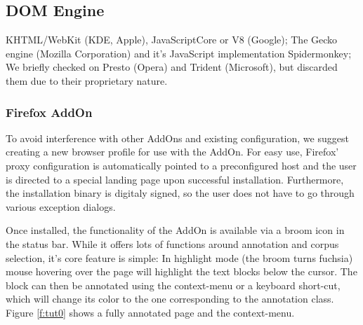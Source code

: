 \subsection{DOM Engine}

KHTML/WebKit (KDE, Apple), JavaScriptCore or V8 (Google);
The Gecko engine (Mozilla Corporation) and it's JavaScript implementation Spidermonkey;
We briefly checked on Presto (Opera) and Trident (Microsoft), but discarded them due to their proprietary nature.

\subsubsection{Firefox AddOn}

To avoid interference with other AddOns and existing configuration, we suggest creating a new browser profile for use with the AddOn.
For easy use, Firefox' proxy configuration is automatically pointed to a preconfigured host and the user is directed to a special landing page upon successful installation.
Furthermore, the installation binary is digitaly signed, so the user does not have to go through various exception dialogs.


Once installed, the functionality of the AddOn is available via a broom icon in the status bar.
While it offers lots of functions around annotation and corpus selection, it's core feature is simple:
In highlight mode (the broom turns fuchsia) mouse hovering over the page will highlight the text blocks below the cursor.
The block can then be annotated using the context-menu or a keyboard short-cut, which will change its color to the one corresponding to the annotation class.
Figure \ref{f:tut0} shows a fully annotated page and the context-menu.


